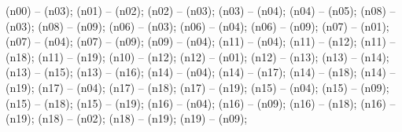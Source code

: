 \begin{scope}
 (n00) -- (n03);
 (n01) -- (n02);
 (n02) -- (n03);
 (n03) -- (n04);
 (n04) -- (n05);
 (n08) -- (n03);
 (n08) -- (n09);
 (n06) -- (n03);
 (n06) -- (n04);
 (n06) -- (n09);
 (n07) -- (n01);
 (n07) -- (n04);
 (n07) -- (n09);
 (n09) -- (n04);
 (n11) -- (n04);
 (n11) -- (n12);
 (n11) -- (n18);
 (n11) -- (n19);
 (n10) -- (n12);
 (n12) -- (n01);
 (n12) -- (n13);
 (n13) -- (n14);
 (n13) -- (n15);
 (n13) -- (n16);
 (n14) -- (n04);
 (n14) -- (n17);
 (n14) -- (n18);
 (n14) -- (n19);
 (n17) -- (n04);
 (n17) -- (n18);
 (n17) -- (n19);
 (n15) -- (n04);
 (n15) -- (n09);
 (n15) -- (n18);
 (n15) -- (n19);
 (n16) -- (n04);
 (n16) -- (n09);
 (n16) -- (n18);
 (n16) -- (n19);
 (n18) -- (n02);
 (n18) -- (n19);
 (n19) -- (n09);
\end{scope}
